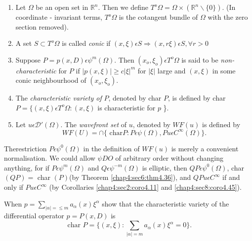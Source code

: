 \setcounter{defi}{46}
\begin{defi}\label{chap4:sec9:def4.47}%
  \begin{enumerate}[\rm (i)]
  \item Let $\Omega$ be an open set in $\mathbb{R}^n$. Then we define
    $T^o \Omega = \Omega \times (\mathbb{R}^n \backslash \{ 0 \}) $. (In
    coordinate - invariant terms, $T^o \Omega $ is the cotangent bundle
    of $\Omega$ with the zero section removed). 
  \item A set $S \subset T^o \Omega $ is called {\em conic } if $(x,
    \xi) \epsilon S \Rightarrow (x, r \xi) \epsilon S,  \forall r
    > 0$ 
  \item Suppose $P = p(x,D) \epsilon \psi^{m}(\Omega)$. Then $(x_o,
    \xi_o) \epsilon T^o \Omega $ is said to be \textit{
      non-characteristic } for $P$ if $| p ( x, \xi) | \geq c|\xi|^m$
    for $|\xi|$ large and $(x, \xi)$ in some conic neighbourhood of
    $(x_o, \xi_o)$. 
  \item The \textit{ characteristic variety of } $P$, denoted by char
    $P$, is defined by char $P= \{ (x, \xi)  \epsilon T^o \Omega : (x,
    \xi)$ is characteristic for $p$ \}. 
  \item Let $u \epsilon \mathcal{D}' (\Omega)$. The \textit{
    wavefront set} of $u$, denoted by $WF(u)$ is defined by  
    $$
    WF(U) = \cap \{ \text{ char} P: P \epsilon \psi (\Omega), Pu
    \epsilon C^{\infty}(\Omega)\}. 
    $$
  \end{enumerate}
\end{defi}

The\pageoriginale restriction $P \epsilon \psi^0 (\Omega)$ in the definition of
$WF(u)$ is merely a convenient normalisation. We could allow $\psi D
O$ of arbitrary order without changing anything, for if $P \epsilon
\psi^m (\Omega)$ and $Q \epsilon \psi^{-m} (\Omega)$ is elliptic,
then $QP \epsilon \psi^0 (\Omega)$, char $(QP) =$ char $(P)$(by
Theorem \ref{chap4:sec6:thm4.36}), and $QP u\epsilon C^{\infty}$ if
and only if $Pu \epsilon C^{\infty}$ (by Corollaries
\ref{chap4:sec2:coro4.11} and \ref{chap4:sec8:coro4.45}).  

\begin{exercise}
  When $p = \sum \limits_{|\alpha| = \leq m} a_{\alpha}(x) \xi^{\alpha}$
  show that the characteristic variety of the differential operator $p =
  P(x,D)$ is  
  $$
  \text{ char } P =\{ (x,\xi) : \sum\limits_{|\alpha| = m} a_{\alpha}(x)
  \xi^{\alpha} =0\}. 
  $$
\end{exercise}


